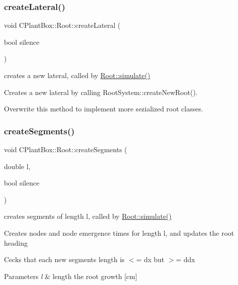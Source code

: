\subsubsection{\texorpdfstring{create\+Lateral()}{createLateral()}}
{\footnotesize\ttfamily void C\+Plant\+Box\+::\+Root\+::create\+Lateral (\begin{DoxyParamCaption}\item[{bool}]{silence }\end{DoxyParamCaption})\hspace{0.3cm}{\ttfamily [protected]}}



creates a new lateral, called by \hyperlink{classCPlantBox_1_1Root_af2fa9d229ab05897214e0ec224f0ae71}{Root\+::simulate()} 

Creates a new lateral by calling Root\+System\+::create\+New\+Root().

Overwrite this method to implement more sezialized root classes. \mbox{\label{classCPlantBox_1_1Root_ade05f972f0110970749e0cee9a29bd8c}} 
\subsubsection{\texorpdfstring{create\+Segments()}{createSegments()}}
{\footnotesize\ttfamily void C\+Plant\+Box\+::\+Root\+::create\+Segments (\begin{DoxyParamCaption}\item[{double}]{l,  }\item[{bool}]{silence }\end{DoxyParamCaption})\hspace{0.3cm}{\ttfamily [protected]}}



creates segments of length l, called by \hyperlink{classCPlantBox_1_1Root_af2fa9d229ab05897214e0ec224f0ae71}{Root\+::simulate()} 

Creates nodes and node emergence times for length l, and updates the root heading

Cecks that each new segments length is $<$= dx but $>$= ddx


\begin{DoxyParams}{Parameters}
{\em l} & length the root growth \mbox{[}cm\mbox{]} \\
\hline
\end{DoxyParams}
\mbox{\label{classCPlantBox_1_1Root_ae81c1b69f5d3cef73b957d887b531ebc}} 
